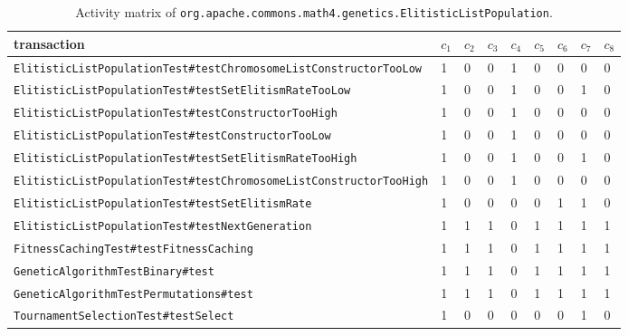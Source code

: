 \documentclass[twoside,a4paper,11pt]{memoir}
\begin{document}
\begin{table}[]
\scriptsize
\centering
\caption{Activity matrix of \texttt{org.apache.commons.math4.genetics.Elitistic\-List\-Population}.}
\label{tab:elitistic}
\begin{adjustbox}{center}
\begin{tabular}{l|llllllll}
transaction                                                       & $c_1$ & $c_2$ & $c_3$ & $c_4$ & $c_5$ & $c_6$ & $c_7$ & $c_8$ \\ \hline
\texttt{ElitisticListPopulationTest\#testChromosomeListConstructorTooLow}  & 1     & 0     & 0     & 1     & 0     & 0     & 0     & 0     \\
\texttt{ElitisticListPopulationTest\#testSetElitismRateTooLow}             & 1     & 0     & 0     & 1     & 0     & 0     & 1     & 0     \\
\texttt{ElitisticListPopulationTest\#testConstructorTooHigh}               & 1     & 0     & 0     & 1     & 0     & 0     & 0     & 0     \\
\texttt{ElitisticListPopulationTest\#testConstructorTooLow}                & 1     & 0     & 0     & 1     & 0     & 0     & 0     & 0     \\
\texttt{ElitisticListPopulationTest\#testSetElitismRateTooHigh}            & 1     & 0     & 0     & 1     & 0     & 0     & 1     & 0     \\
\texttt{ElitisticListPopulationTest\#testChromosomeListConstructorTooHigh} & 1     & 0     & 0     & 1     & 0     & 0     & 0     & 0     \\
\texttt{ElitisticListPopulationTest\#testSetElitismRate}                   & 1     & 0     & 0     & 0     & 0     & 1     & 1     & 0     \\
\texttt{ElitisticListPopulationTest\#testNextGeneration}                   & 1     & 1     & 1     & 0     & 1     & 1     & 1     & 1     \\
\texttt{FitnessCachingTest\#testFitnessCaching}                            & 1     & 1     & 1     & 0     & 1     & 1     & 1     & 1     \\
\texttt{GeneticAlgorithmTestBinary\#test}                                  & 1     & 1     & 1     & 0     & 1     & 1     & 1     & 1     \\
\texttt{GeneticAlgorithmTestPermutations\#test}                            & 1     & 1     & 1     & 0     & 1     & 1     & 1     & 1     \\
\texttt{TournamentSelectionTest\#testSelect}                               & 1     & 0     & 0     & 0     & 0     & 0     & 1     & 0
\end{tabular}
\end{adjustbox}
\end{table}
\end{document}
